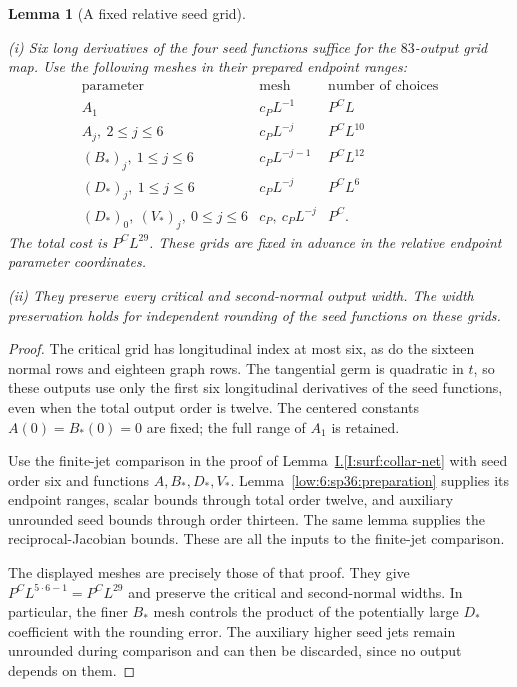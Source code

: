 \documentclass[11pt]{amsart}
\newtheorem{lemma}[theorem]{Lemma}
\theoremstyle{definition}
\theoremstyle{remark}
\numberwithin{equation}{section}
\newcommand{\partIref}[1]{\hyperref[I:#1]{I.\ref*{I:#1}}}
\begin{document}
\begin{lemma}[A fixed relative seed grid]\label{low:6:sp36:rounding}

\noindent\textup{(i)} Six long derivatives of the four seed functions suffice for the $83$-output grid map. Use the following meshes in their prepared endpoint ranges:
\[
\begin{array}{c|c|c}
\text{parameter}&\text{mesh}&\text{number of choices}\\ \hline
A_1&c_PL^{-1}&P^CL\\
A_j,\ 2\le j\le6&c_PL^{-j}&P^CL^{10}\\
(B_*)_j,\ 1\le j\le6&c_PL^{-j-1}&P^CL^{12}\\
(D_*)_j,\ 1\le j\le6&c_PL^{-j}&P^CL^6\\
(D_*)_0,\ (V_*)_j,\ 0\le j\le6&c_P,\ c_PL^{-j}&P^C.
\end{array}
\]
The total cost is $P^CL^{29}$. These grids are fixed in advance in the relative endpoint parameter coordinates.

\noindent\textup{(ii)} They preserve every critical and second-normal output width. The width preservation holds for independent rounding of the seed functions on these grids.
\end{lemma}
\begin{proof}
The critical grid has longitudinal index at most six, as do the sixteen normal rows and eighteen graph rows. The tangential germ is quadratic in $t$, so these outputs use only the first six longitudinal derivatives of the seed functions, even when the total output order is twelve. The centered constants $A(0)=B_*(0)=0$ are fixed; the full range of $A_1$ is retained.

Use the finite-jet comparison in the proof of Lemma~\partIref{surf:collar-net} with seed order six and functions $A,B_*,D_*,V_*$. Lemma~\ref{low:6:sp36:preparation} supplies its endpoint ranges, scalar bounds through total order twelve, and auxiliary unrounded seed bounds through order thirteen. The same lemma supplies the reciprocal-Jacobian bounds. These are all the inputs to the finite-jet comparison.

The displayed meshes are precisely those of that proof. They give $P^CL^{5\cdot6-1}=P^CL^{29}$ and preserve the critical and second-normal widths. In particular, the finer $B_*$ mesh controls the product of the potentially large $D_*$ coefficient with the rounding error. The auxiliary higher seed jets remain unrounded during comparison and can then be discarded, since no output depends on them.
\end{proof}
\end{document}
